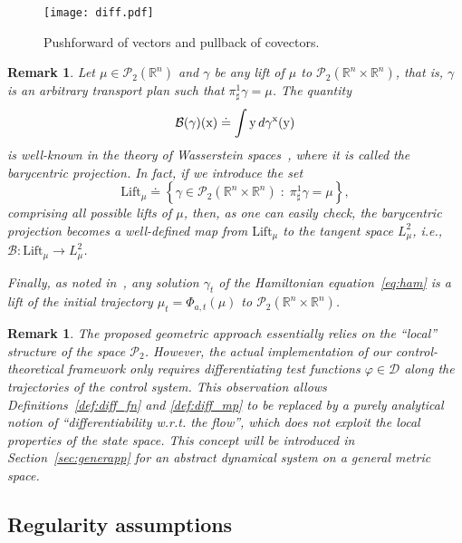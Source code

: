 \documentclass[sn-mathphys-num]{sn-jnl}
\numberwithin{equation}{section}
\theoremstyle{mythm}
\theoremstyle{mydef}
\newtheorem{remark}[proposition]{Remark}
\renewcommand{\phi}{\varphi}
\renewcommand{\d}{\,d}
\begin{document}
\begin{figure}
  \centering
  \texttt{[image: diff.pdf]}
  \caption{Pushforward of vectors and pullback of covectors.}
  \label{fig:diff}
\end{figure}

\begin{remark}
  Let \( \mu\in \mathcal{P}_2(\mathbb{R}^n) \) and \( \gamma \) be any lift of \( \mu \) to \( \mathcal{P}_2(\mathbb{R}^n \times \mathbb{R}^n) \), that is, \( \gamma \) is an arbitrary transport plan such that \( \pi^1_\sharp \gamma = \mu \).
  The quantity 
  \[
    \mathcal{B}(\gamma)(\mathrm x) \doteq \int {\rm y}\d \gamma^{\rm x}(\mathrm y) 
  \]
  is well-known in the theory of Wasserstein spaces~\cite{ambrosioGradientFlowsMetric2005}, where it is called the \emph{barycentric projection}.
  In fact, if we introduce the set 
  \[
    \mathrm{Lift}_\mu\doteq \left\{\gamma\in \mathcal{P}_2(\mathbb{R}^n \times \mathbb{R}^n)\;\colon\; \pi^1_\sharp \gamma = \mu\right\},
  \]
comprising all possible lifts of \( \mu \), then, as one can easily check, the barycentric projection becomes a well-defined map from \( \mathrm{Lift}_{\mu} \) to the tangent space \( L^2_{\mu} \), i.e., \( \mathcal{B}\colon \textrm{Lift}_{\mu}\to L^2_{\mu} \).

Finally, as noted in~\cite[Section 3.3]{chertovskihOptimalControlNonlocal2023}, any solution \( \gamma_t \) of the Hamiltonian equation~\eqref{eq:ham} is a lift of the initial trajectory \( \mu_t = \Phi_{a,t}(\mu) \) to \( \mathcal{P}_2(\mathbb{R}^n \times \mathbb{R}^n) \). 
\end{remark}

\begin{remark}
The proposed geometric approach essentially relies on the ``local'' structure of the space $\mathcal{P}_2$. However, the actual implementation of our control-theoretical framework only requires differentiating test functions $\phi \in \bm{\mathcal{D}}$ along the trajectories of the control system. This observation allows Definitions~\ref{def:diff_fn} and \ref{def:diff_mp} to be replaced by a purely analytical notion of ``differentiability w.r.t. the flow'', which does not exploit the local properties of the state space. This concept will be introduced in Section~\ref{sec:generapp} for an abstract dynamical system on a general metric space.
\end{remark}

\subsection{Regularity assumptions}
\end{document}
